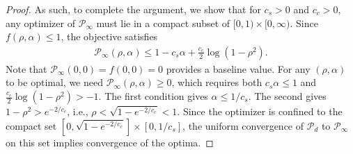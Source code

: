 \documentclass[10pt,a4paper]{amsart}
\begin{document}
\begin{proof}
{As such, to complete the argument, we show that for $c_s > 0$ and $c_c > 0$, any optimizer of $\mathcal{P}_\infty$ must lie in a compact subset of $[0,1) \times [0,\infty)$. Since $f(\rho, \alpha) \leq 1$, the objective satisfies
\begin{align*}
    \mathcal{P}_\infty(\rho, \alpha) \leq 1 - c_s \alpha + \frac{c_c}{2} \log(1-\rho^2).
\end{align*}
Note that $\mathcal{P}_\infty(0, 0) = f(0,0) = 0$ provides a baseline value. For any $(\rho, \alpha)$ to be optimal, we need $\mathcal{P}_\infty(\rho, \alpha) \geq 0$, which requires both $c_s \alpha \leq 1$ and $\frac{c_c}{2} \log(1-\rho^2) > -1$. The first condition gives $\alpha \leq 1/c_s$. The second gives $1-\rho^2 > e^{-2/c_c}$, i.e., $\rho < \sqrt{1 - e^{-2/c_c}} < 1$. Since the optimizer is confined to the compact set $[0, \sqrt{1 - e^{-2/c_c}}] \times [0, 1/c_s]$, the uniform convergence of $\mathcal{P}_d$ to $\mathcal{P}_\infty$ on this set implies convergence of the optima.}


\end{proof}
\end{document}
